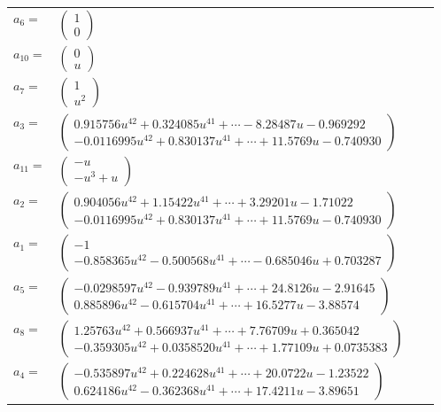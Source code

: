 \documentclass[1p]{elsarticle_modified}
\theoremstyle{definition}
\begin{document}
\begin{tabular}{m{7pt} m{180pt} m{7pt} m{180pt} }
\flushright $a_{6}=$&$\begin{pmatrix}1\\0\end{pmatrix}$ \\
\flushright $a_{10}=$&$\begin{pmatrix}0\\u\end{pmatrix}$ \\
\flushright $a_{7}=$&$\begin{pmatrix}1\\u^2\end{pmatrix}$ \\
\flushright $a_{3}=$&$\begin{pmatrix}0.915756 u^{42}+0.324085 u^{41}+\cdots-8.28487 u-0.969292\\-0.0116995 u^{42}+0.830137 u^{41}+\cdots+11.5769 u-0.740930\end{pmatrix}$ \\
\flushright $a_{11}=$&$\begin{pmatrix}- u\\- u^3+u\end{pmatrix}$ \\
\flushright $a_{2}=$&$\begin{pmatrix}0.904056 u^{42}+1.15422 u^{41}+\cdots+3.29201 u-1.71022\\-0.0116995 u^{42}+0.830137 u^{41}+\cdots+11.5769 u-0.740930\end{pmatrix}$ \\
\flushright $a_{1}=$&$\begin{pmatrix}-1\\-0.858365 u^{42}-0.500568 u^{41}+\cdots-0.685046 u+0.703287\end{pmatrix}$ \\
\flushright $a_{5}=$&$\begin{pmatrix}-0.0298597 u^{42}-0.939789 u^{41}+\cdots+24.8126 u-2.91645\\0.885896 u^{42}-0.615704 u^{41}+\cdots+16.5277 u-3.88574\end{pmatrix}$ \\
\flushright $a_{8}=$&$\begin{pmatrix}1.25763 u^{42}+0.566937 u^{41}+\cdots+7.76709 u+0.365042\\-0.359305 u^{42}+0.0358520 u^{41}+\cdots+1.77109 u+0.0735383\end{pmatrix}$ \\
\flushright $a_{4}=$&$\begin{pmatrix}-0.535897 u^{42}+0.224628 u^{41}+\cdots+20.0722 u-1.23522\\0.624186 u^{42}-0.362368 u^{41}+\cdots+17.4211 u-3.89651\end{pmatrix}$ \\

\end{tabular}
\end{document}
